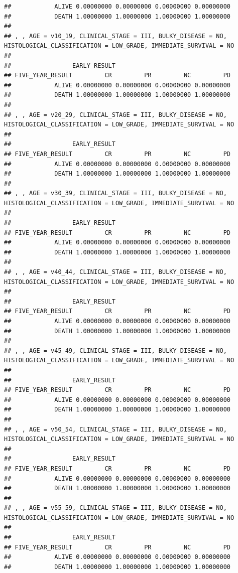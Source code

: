 \documentclass[]{article}
\begin{document}
\begin{verbatim}
##            ALIVE 0.00000000 0.00000000 0.00000000 0.00000000
##            DEATH 1.00000000 1.00000000 1.00000000 1.00000000
## 
## , , AGE = v10_19, CLINICAL_STAGE = III, BULKY_DISEASE = NO, HISTOLOGICAL_CLASSIFICATION = LOW_GRADE, IMMEDIATE_SURVIVAL = NO
## 
##                 EARLY_RESULT
## FIVE_YEAR_RESULT         CR         PR         NC         PD
##            ALIVE 0.00000000 0.00000000 0.00000000 0.00000000
##            DEATH 1.00000000 1.00000000 1.00000000 1.00000000
## 
## , , AGE = v20_29, CLINICAL_STAGE = III, BULKY_DISEASE = NO, HISTOLOGICAL_CLASSIFICATION = LOW_GRADE, IMMEDIATE_SURVIVAL = NO
## 
##                 EARLY_RESULT
## FIVE_YEAR_RESULT         CR         PR         NC         PD
##            ALIVE 0.00000000 0.00000000 0.00000000 0.00000000
##            DEATH 1.00000000 1.00000000 1.00000000 1.00000000
## 
## , , AGE = v30_39, CLINICAL_STAGE = III, BULKY_DISEASE = NO, HISTOLOGICAL_CLASSIFICATION = LOW_GRADE, IMMEDIATE_SURVIVAL = NO
## 
##                 EARLY_RESULT
## FIVE_YEAR_RESULT         CR         PR         NC         PD
##            ALIVE 0.00000000 0.00000000 0.00000000 0.00000000
##            DEATH 1.00000000 1.00000000 1.00000000 1.00000000
## 
## , , AGE = v40_44, CLINICAL_STAGE = III, BULKY_DISEASE = NO, HISTOLOGICAL_CLASSIFICATION = LOW_GRADE, IMMEDIATE_SURVIVAL = NO
## 
##                 EARLY_RESULT
## FIVE_YEAR_RESULT         CR         PR         NC         PD
##            ALIVE 0.00000000 0.00000000 0.00000000 0.00000000
##            DEATH 1.00000000 1.00000000 1.00000000 1.00000000
## 
## , , AGE = v45_49, CLINICAL_STAGE = III, BULKY_DISEASE = NO, HISTOLOGICAL_CLASSIFICATION = LOW_GRADE, IMMEDIATE_SURVIVAL = NO
## 
##                 EARLY_RESULT
## FIVE_YEAR_RESULT         CR         PR         NC         PD
##            ALIVE 0.00000000 0.00000000 0.00000000 0.00000000
##            DEATH 1.00000000 1.00000000 1.00000000 1.00000000
## 
## , , AGE = v50_54, CLINICAL_STAGE = III, BULKY_DISEASE = NO, HISTOLOGICAL_CLASSIFICATION = LOW_GRADE, IMMEDIATE_SURVIVAL = NO
## 
##                 EARLY_RESULT
## FIVE_YEAR_RESULT         CR         PR         NC         PD
##            ALIVE 0.00000000 0.00000000 0.00000000 0.00000000
##            DEATH 1.00000000 1.00000000 1.00000000 1.00000000
## 
## , , AGE = v55_59, CLINICAL_STAGE = III, BULKY_DISEASE = NO, HISTOLOGICAL_CLASSIFICATION = LOW_GRADE, IMMEDIATE_SURVIVAL = NO
## 
##                 EARLY_RESULT
## FIVE_YEAR_RESULT         CR         PR         NC         PD
##            ALIVE 0.00000000 0.00000000 0.00000000 0.00000000
##            DEATH 1.00000000 1.00000000 1.00000000 1.00000000

\end{verbatim}
\end{document}
